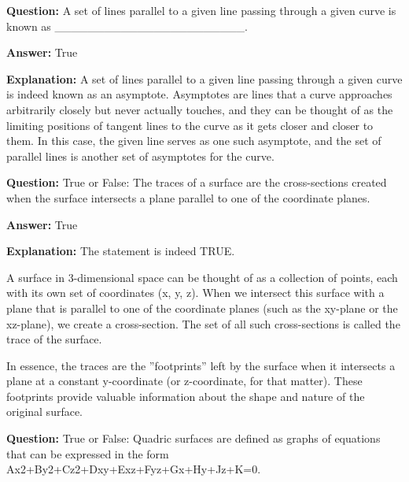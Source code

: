 \documentclass{article}
\begin{document}
                \vspace{0.5cm} 
        
            
                \textbf {Question:} A set of lines parallel to a given line passing through a given curve is known as \_\_\_\_\_\_\_\_\_\_\_\_\_\_\_\_\_\_\_\_\_\_\_.
                
                \textbf{Answer:} True

                \textbf{Explanation:} A set of lines parallel to a given line passing through a given curve is indeed known as an asymptote. Asymptotes are lines that a curve approaches arbitrarily closely but never actually touches, and they can be thought of as the limiting positions of tangent lines to the curve as it gets closer and closer to them. In this case, the given line serves as one such asymptote, and the set of parallel lines is another set of asymptotes for the curve.
                
                \vspace{0.5cm} 
        
            
                \textbf {Question:} True or False: The traces of a surface are the cross-sections created when the surface intersects a plane parallel to one of the coordinate planes.
                
                \textbf{Answer:} True

                \textbf{Explanation:} The statement is indeed TRUE.

A surface in 3-dimensional space can be thought of as a collection of points, each with its own set of coordinates (x, y, z). When we intersect this surface with a plane that is parallel to one of the coordinate planes (such as the xy-plane or the xz-plane), we create a cross-section. The set of all such cross-sections is called the trace of the surface.

In essence, the traces are the ''footprints'' left by the surface when it intersects a plane at a constant y-coordinate (or z-coordinate, for that matter). These footprints provide valuable information about the shape and nature of the original surface.
                
                \vspace{0.5cm} 
        
            
                \textbf {Question:} True or False: Quadric surfaces are defined as graphs of equations that can be expressed in the form Ax2+By2+Cz2+Dxy+Exz+Fyz+Gx+Hy+Jz+K=0.
                
\end{document}
